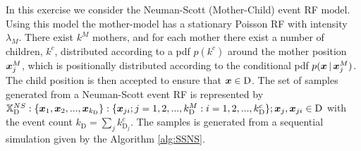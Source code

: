 \section{}
\label{sec:problem3}
In this exercise we consider the Neuman-Scott (Mother-Child) event RF model. Using this model the mother-model has a stationary Poisson RF with intensity $\lambda_M$. There exist $k^M$ mothers, and for each mother there exist a number of children, $k^c$, distributed according to a pdf $p(k^c)$ around the mother position $\bm{x}_j^M$, which is positionally distributed according to the conditional pdf $p(\bm{x} \, | \, \bm{x}_j^M)$. The child position is then accepted to ensure that $\bm{x} \in \textrm{D}$. The set of samples generated from a Neuman-Scott event RF  is represented by
$\mathbb{X}_\textrm{D}^{NS}:\{\bm{x}_1,\bm{x}_2,...,\bm{x}_{k_\textrm{D}}\}:\{\bm{x}_{ji};j=1,2,...,k_\textrm{D}^M:i = 1,2,...,k_\textrm{D}^c\};\bm{x}_j,\bm{x}_{ji}\in \textrm{D}$ with the event count $k_\textrm{D} = \sum_j k_{\textrm{D}_j}^c$. The samples is generated from a sequential simulation given by the Algorithm \ref{alg:SSNS}.


